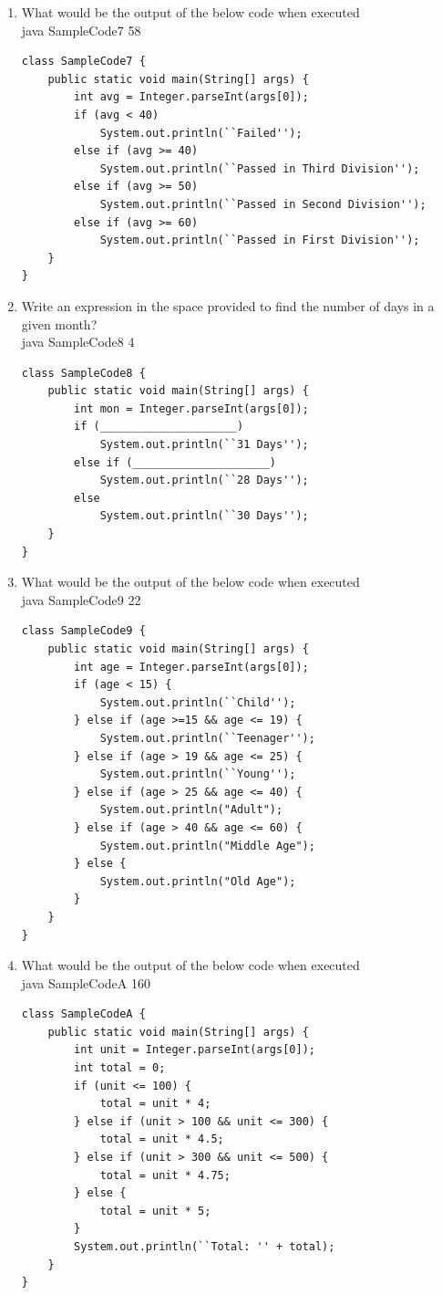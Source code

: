 \documentclass[11pt,a4paper]{article}
\def\AnswerBox{\fbox{\begin{minipage}{4in}\hfill\vspace{0.5in}\end{minipage}}}
\begin{document}
\begin{enumerate}
\item What would be the output of the below code when executed\\
    java SampleCode7 58
\begin{lstlisting} 
class SampleCode7 {
    public static void main(String[] args) {
        int avg = Integer.parseInt(args[0]);
        if (avg < 40)
            System.out.println(``Failed'');
        else if (avg >= 40)
            System.out.println(``Passed in Third Division'');
        else if (avg >= 50)
            System.out.println(``Passed in Second Division'');
        else if (avg >= 60)
            System.out.println(``Passed in First Division'');
    }
}
\end{lstlisting} 
\AnswerBox

\item Write an expression in the space provided to find the number of days in a given month?\\
    java SampleCode8 4
\begin{lstlisting} 
class SampleCode8 {
    public static void main(String[] args) {
        int mon = Integer.parseInt(args[0]);
        if (_____________________)
            System.out.println(``31 Days'');
        else if (_____________________)
            System.out.println(``28 Days'');
        else
            System.out.println(``30 Days'');
    }
}
\end{lstlisting} 

\AnswerBox

\item What would be the output of the below code when executed\\
    java SampleCode9 22
\begin{lstlisting}
class SampleCode9 {
    public static void main(String[] args) {
        int age = Integer.parseInt(args[0]);                         
        if (age < 15) {                  
            System.out.println(``Child''); 
        } else if (age >=15 && age <= 19) {             
            System.out.println(``Teenager'');       
        } else if (age > 19 && age <= 25) {
            System.out.println(``Young'');     
        } else if (age > 25 && age <= 40) {
            System.out.println("Adult");
        } else if (age > 40 && age <= 60) {
            System.out.println("Middle Age");
        } else {
            System.out.println("Old Age");
        }
    }
}
\end{lstlisting}
\AnswerBox

\item What would be the output of the below code when executed\\
    java SampleCodeA 160
\begin{lstlisting}
class SampleCodeA {
    public static void main(String[] args) {
        int unit = Integer.parseInt(args[0]);
        int total = 0;
        if (unit <= 100) {
            total = unit * 4;
        } else if (unit > 100 && unit <= 300) {
            total = unit * 4.5;
        } else if (unit > 300 && unit <= 500) {
            total = unit * 4.75;
        } else {
            total = unit * 5;
        }
        System.out.println(``Total: '' + total);
    }
}
\end{lstlisting}
\AnswerBox


\end{enumerate}
\end{document}
